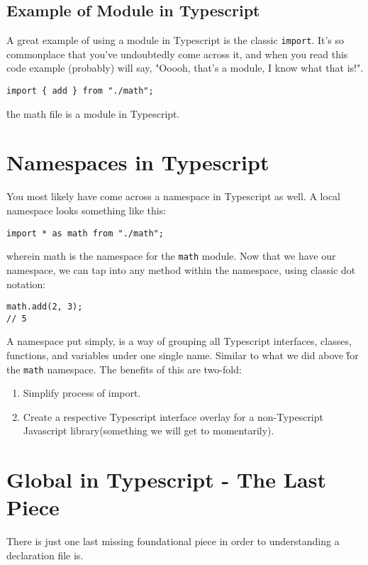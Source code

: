 \subsection{Example of Module in Typescript}
A great example of using a module in Typescript is the classic \lstinline{import}. It's so commonplace that you've undoubtedly come across it, and when you read this code example (probably) will say, "Ooooh, that's a module, I know what that is!".
\begin{lstlisting}
import { add } from "./math";
\end{lstlisting}

\^ the math file is a module in Typescript.

\section{Namespaces in Typescript}
You most likely have come across a namespace in Typescript as well. A local namespace looks something like this:

\begin{lstlisting}
import * as math from "./math";
\end{lstlisting}

wherein math is the namespace for the \lstinline{math} module. Now that we have our namespace, we can tap into any method within the namespace, using classic dot notation:

\begin{verbatim}  
math.add(2, 3);
// 5  
\end{verbatim}

A namespace put simply, is a way of grouping all Typescript interfaces, classes,  functions, and variables under one single name. Similar to what we did above \^ for the \lstinline{math} namespace. The benefits of this are two-fold: 
\begin{enumerate}
  \item Simplify process of import.
  \item Create a respective Typescript interface overlay \textrightarrow{} for a non-Typescript Javascript library(something we will get to momentarily). 
\end{enumerate}

\section{Global in Typescript - The Last Piece}
There is just one last missing foundational piece in order to understanding a declaration file is. 

